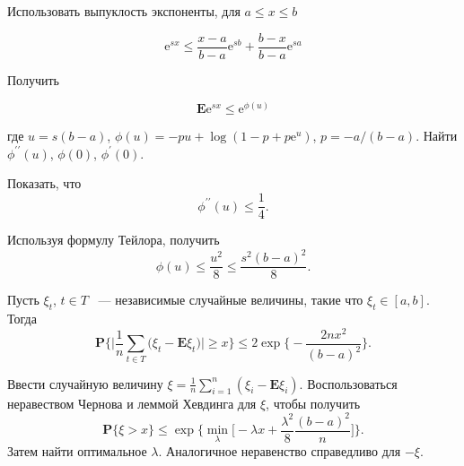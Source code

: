 \begin{remark}
Использовать выпуклость экспоненты, для $a\leq x\leq b$

\begin{equation*}
\text{e}^{sx} \leq \frac{x-a}{b-a} \text{e}^{sb}+\frac{b-x}{b-a}\text{e}^{sa} 
\end{equation*}

Получить 

\begin{equation*}
\mathbf{E}\text{e}^{sx} \leq \text{e}^{\phi(u)}
\end{equation*}

где $u = s(b-a)$, $\phi(u) = -pu+\log(1-p+p\text{e}^u)$, $p = -a/(b-a)$.
Найти $\phi^{\prime\prime}(u)$,   $\phi(0)$, $\phi^{\prime}(0)$.

Показать, что 
\begin{equation*}
\phi^{\prime\prime}(u)\leq \frac{1}{4}.
\end{equation*}

Используя формулу Тейлора, получить  
\begin{equation*}
\phi(u) \leq \frac{u^2}{8}\leq \frac{s^2(b-a)^2}{8}.
\end{equation*}
\end{remark}

\begin{problem} Пусть $\xi_t$, $t\in T$ ~--- независимые случайные величины, такие что $\xi_t\in[a,b]$. Тогда
\begin{equation*}
\mathbf{P}\bigg\{\bigg|\frac{1}{n}\sum_{t\in T}\big(\xi_t-\mathbf{E}\xi_t\bigr)\biggr|\geq x\biggr\}\leq 2\exp\bigg\{-\frac{2nx^2}{(b-a)^2}\biggr\}.
\end{equation*}
\end{problem}
\begin{remark}
Ввести случайную величину $\xi = \frac{1}{n}\sum_{i=1}^n(\xi_i-\mathbf{E}\xi_i)$.
Воспользоваться неравеством Чернова и леммой Хевдинга для $\xi$, чтобы получить
\begin{equation*}
\mathbf{P}\{\xi>x\}\leq \exp\bigg\{\min_{\lambda}\bigg[-\lambda x + \frac{\lambda^2}{8}\frac{(b-a)^2}{n}\biggr]\biggr\}.
\end{equation*}
Затем найти оптимальное $\lambda$.  Аналогичное неравенство справедливо для $-\xi$.
\end{remark}

